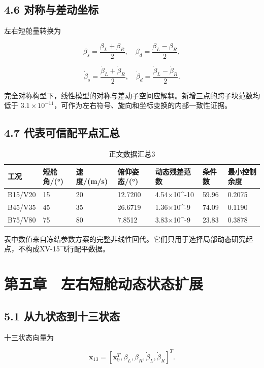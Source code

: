 \documentclass[UTF8,12pt,openany]{ctexbook}
\begin{document}
\section{4.6 对称与差动坐标}

左右短舱量转换为

$$\beta_s=\frac{\beta_L+\beta_R}2,\quad
\beta_d=\frac{\beta_L-\beta_R}2,$$

$$\dot\beta_s=\frac{\dot\beta_L+\dot\beta_R}2,\quad
\dot\beta_d=\frac{\dot\beta_L-\dot\beta_R}2.$$

完全对称构型下，线性模型的对称与差动子空间应解耦。新增三点的跨子块范数均低于 $3.1\times10^{-11}$，可作为左右符号、旋向和坐标变换的内部一致性证据。



\section{4.7 代表可信配平点汇总}

\begin{longtable}{p{}p{}p{}p{}p{}p{}p{}}
\caption{正文数据汇总3}\label{tab:auto-3}\\
\toprule
工况 & 短舱角/(°) & 速度/(m/s) & 俯仰姿态/(°) & 动态残差范数 & 条件数 & 最小控制余度 \\
\midrule
B15/V20 & 15 & 20 & 12.7200 & 4.54×10^-10 & 59.96 & 0.2075 \\
B45/V35 & 45 & 35 & 26.6719 & 1.36×10^-9 & 74.09 & 0.1190 \\
B75/V80 & 75 & 80 & 7.8512 & 3.83×10^-9 & 23.83 & 0.3878 \\
\bottomrule
\end{longtable}

表中数值来自冻结参数方案的完整非线性回代。它们只用于选择局部动态研究起点，不构成XV-15飞行配平数据。


\chapter{第五章　左右短舱动态状态扩展}

\section{5.1 从九状态到十三状态}

十三状态向量为

$$\mathbf{x}_{13}=
[\mathbf{x}_9^T,\beta_L,\beta_R,\dot\beta_L,\dot\beta_R]^T.$$
\end{document}
